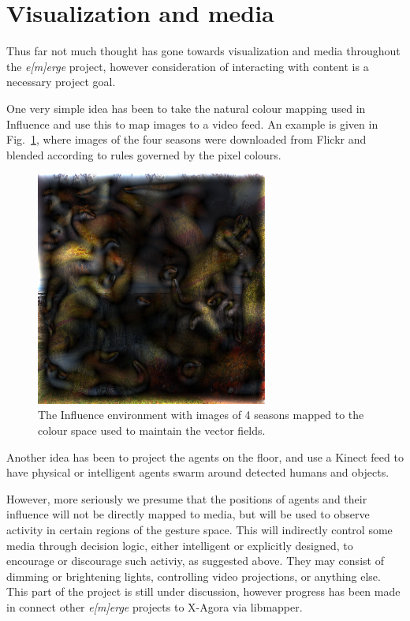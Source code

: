 \documentclass{article}
\newcommand{\emerge}{\emph{e[m]erge}\xspace}
\begin{document}
\section{Visualization and media}

Thus far not much thought has gone towards visualization and media
throughout the \emerge project, however consideration of interacting
with content is a necessary project goal.

One very simple idea has been to take the natural colour mapping used
in Influence and use this to map images to a video feed.
An example is given in Fig.~\ref{fig:influenceblend}, where images of
the four seasons were downloaded from Flickr and blended according to
rules governed by the pixel colours.

\begin{figure}
\centerline{
  \includegraphics[width=3in]{influence_blend.png}}
  \caption{The Influence environment with images of 4 seasons mapped
    to the colour space used to maintain the vector fields.}
\label{fig:influenceblend}
\end{figure}

Another idea has been to project the agents on the floor, and use a
Kinect feed to have physical or intelligent agents swarm around
detected humans and objects.

However, more seriously we presume that the positions of agents and
their influence will not be directly mapped to media, but will be used
to observe activity in certain regions of the gesture space.
This will indirectly control some media through decision logic, either
intelligent or explicitly designed, to encourage or discourage such
activiy, as suggested above.
They may consist of dimming or brightening lights, controlling video
projections, or anything else.
This part of the project is still under discussion, however progress
has been made in connect other \emerge projects to X-Agora via
libmapper.
\end{document}
